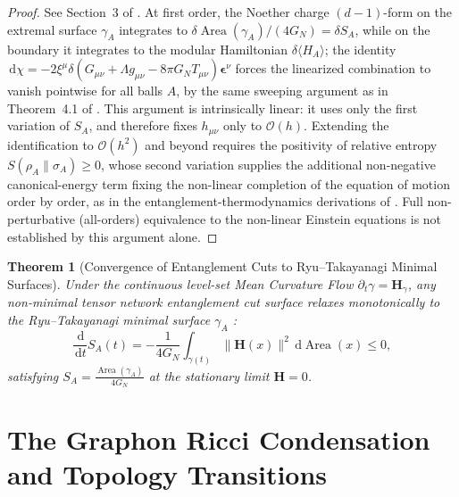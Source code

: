 \documentclass[11pt,a4paper,reqno]{amsart}
\newtheorem{theorem}{Theorem}[section]
\theoremstyle{definition}
\numberwithin{equation}{section}
\providecommand{\Area}{\operatorname{Area}}
\newcommand{\dif}{\,\mathrm{d}}
\providecommand{\Area}{\mathrm{Area}}
\begin{document}
\begin{proof}
See Section~3 of \cite{silvafilho2026spacetime}. At first order, the Noether charge $(d-1)$-form on the extremal surface $\gamma_A$ integrates to $\delta \Area(\gamma_A)/(4G_N) = \delta S_A$, while on the boundary it integrates to the modular Hamiltonian $\delta\langle H_A\rangle$; the identity $\dif\chi = -2\xi^\mu \delta(G_{\mu\nu} + \Lambda g_{\mu\nu} - 8\pi G_N T_{\mu\nu})\mathbf{\epsilon}^\nu$ forces the linearized combination to vanish pointwise for all balls $A$, by the same sweeping argument as in Theorem~4.1 of \cite{silvafilho2026spacetime}. This argument is intrinsically linear: it uses only the first variation of $S_A$, and therefore fixes $h_{\mu\nu}$ only to $\mathcal{O}(h)$. Extending the identification to $\mathcal{O}(h^2)$ and beyond requires the positivity of relative entropy $S(\rho_A\|\sigma_A) \ge 0$, whose second variation supplies the additional non-negative canonical-energy term fixing the non-linear completion of the equation of motion order by order, as in the entanglement-thermodynamics derivations of \cite{faulkner2014gravitation, lashkari2016canonical}. Full non-perturbative (all-orders) equivalence to the non-linear Einstein equations is not established by this argument alone.
\end{proof}

\begin{theorem}[Convergence of Entanglement Cuts to Ryu--Takayanagi Minimal Surfaces]
\label{thm:rt_mcf_convergence}
Under the continuous level-set Mean Curvature Flow $\partial_t \gamma = \mathbf{H}_\gamma$, any non-minimal tensor network entanglement cut surface relaxes monotonically to the Ryu--Takayanagi minimal surface $\gamma_A$ \cite{ryu2006holographic}:
\begin{equation}
    \frac{\dif}{\dif t} S_A(t) = -\frac{1}{4 G_N} \int_{\gamma(t)} \|\mathbf{H}(x)\|^2 \dif \Area(x) \le 0,
\end{equation}
satisfying $S_A = \frac{\Area(\gamma_A)}{4 G_N}$ at the stationary limit $\mathbf{H} = 0$.
\end{theorem}

\section{The Graphon Ricci Condensation and Topology Transitions}
\label{sec:graphon_condensation}
\end{document}
